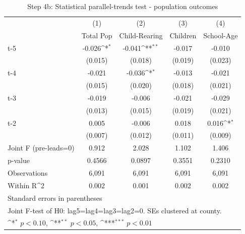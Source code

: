 \begin{table}[htbp]\centering
\def\sym#1{\ifmmode^{#1}\else\(^{#1}\)\fi}
\caption{Step 4b: Statistical parallel-trends test - population outcomes}
\begin{tabular}{l*{4}{c}}
\hline\hline
            &\multicolumn{1}{c}{(1)}&\multicolumn{1}{c}{(2)}&\multicolumn{1}{c}{(3)}&\multicolumn{1}{c}{(4)}\\
            &\multicolumn{1}{c}{Total Pop}&\multicolumn{1}{c}{Child-Rearing}&\multicolumn{1}{c}{Children}&\multicolumn{1}{c}{School-Age}\\
\hline
t-5         &      -0.026\sym{*}  &      -0.041\sym{**} &      -0.017         &      -0.010         \\
            &     (0.015)         &     (0.018)         &     (0.019)         &     (0.023)         \\
[1em]
t-4         &      -0.021         &      -0.036\sym{*}  &      -0.013         &      -0.021         \\
            &     (0.015)         &     (0.020)         &     (0.018)         &     (0.021)         \\
[1em]
t-3         &      -0.019         &      -0.006         &      -0.021         &      -0.029         \\
            &     (0.013)         &     (0.015)         &     (0.019)         &     (0.021)         \\
[1em]
t-2         &       0.005         &      -0.006         &       0.018         &       0.016\sym{*}  \\
            &     (0.007)         &     (0.012)         &     (0.011)         &     (0.009)         \\
\hline
Joint F (pre-leads=0)&       0.912         &       2.028         &       1.102         &       1.406         \\
p-value     &      0.4566         &      0.0897         &      0.3551         &      0.2310         \\
Observations&       6,091         &       6,091         &       6,091         &       6,091         \\
Within R^2  &       0.002         &       0.001         &       0.002         &       0.002         \\
\hline\hline
\multicolumn{5}{l}{\footnotesize Standard errors in parentheses}\\
\multicolumn{5}{l}{\footnotesize Joint F-test of H0: lag5=lag4=lag3=lag2=0. SEs clustered at county.}\\
\multicolumn{5}{l}{\footnotesize \sym{*} \(p<0.10\), \sym{**} \(p<0.05\), \sym{***} \(p<0.01\)}\\
\end{tabular}
\end{table}
